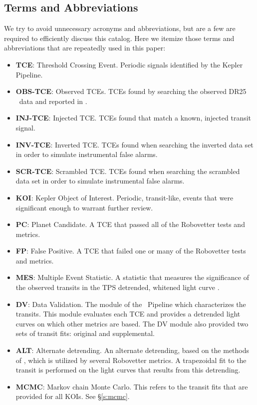 \subsection{Terms and Abbreviations}
\label{abbrev}
We try to avoid unnecessary acronyms and abbreviations, but are a few are required to efficiently discuss this catalog.  Here we itemize those terms and abbreviations that are repeatedly used in this paper:

\begin{itemize}
\item[] \textbf{TCE}: Threshold Crossing Event. Periodic signals identified by the Kepler Pipeline.
\item[] \textbf{OBS-TCE}: Observed TCEs. TCEs found by searching the observed DR25 \Kepler\ data and reported in \citet{Twicken2016}.
\item[] \textbf{INJ-TCE}: Injected TCE. TCEs found that match a known, injected transit signal.
\item[] \textbf{INV-TCE}: Inverted TCE. TCEs found when searching the inverted data set in order to simulate instrumental false alarms.
\item[] \textbf{SCR-TCE}: Scrambled TCE. TCEs found when searching the scrambled data set in order to simulate instrumental false alarms.
\item[] \textbf{KOI}: Kepler Object of Interest. Periodic, transit-like, events that were significant enough to warrant further review. 
\item[] \textbf{PC}: Planet Candidate. A TCE that passed all of the Robovetter tests and metrics.
\item[] \textbf{FP}: False Positive. A TCE that failed one or many of the Robovetter tests and metrics.
\item[] \textbf{MES}: Multiple Event Statistic. A statistic that measures the significance of the observed transits in the TPS detrended, whitened light curve \citep{Jenkins2002a}.
\item[] \textbf{DV}: Data Validation. The module of the \Kepler\ Pipeline which characterizes the transits. This module evaluates each TCE and provides a detrended light curves on which other metrics are based. The DV module also provided two sets of transit fits: original and supplemental.
\item[] \textbf{ALT}: Alternate detrending. An alternate detrending, based on the methods of \citet{Garcia2010}, which is utilized by several Robovetter metrics. A trapezoidal fit to the transit is performed on the light curves that results from this detrending.
\item[] \textbf{MCMC}: Markov chain Monte Carlo. This refers to the transit fits that are provided for all KOIs. See \S\ref{s:mcmc}.

\end{itemize}
